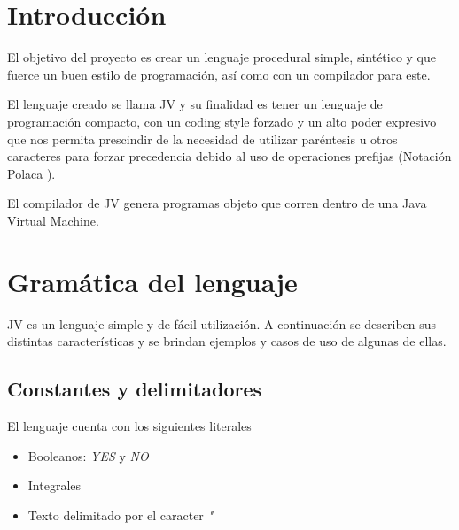 \documentclass[spanish]{article}
\begin{document}
    
    \clearpage
    \tableofcontents
    
    \clearpage

    \section{Introducción}
        \par El objetivo del proyecto es crear un lenguaje procedural simple, sintético y que fuerce un buen estilo de programación, así  como con un compilador para este.\\
        \par El lenguaje creado se llama JV y su finalidad es tener un lenguaje de programación compacto, con un coding style forzado y un alto poder expresivo que nos permita prescindir de la necesidad de utilizar paréntesis u otros caracteres para forzar precedencia debido al uso de operaciones prefijas (Notación Polaca \cite{polish}).
        \par El compilador de JV genera programas objeto que corren dentro de una Java Virtual Machine.
    \clearpage


    \section{Gramática del lenguaje}

        \par JV es un lenguaje simple y de fácil utilización. A continuación se describen sus distintas características y se brindan ejemplos y casos de uso de algunas de ellas.
        \\

        \subsection{Constantes y delimitadores}

            El lenguaje cuenta con los siguientes literales
            \begin{itemize}
            \item Booleanos: \textit{YES} y \textit{NO}    
            \item Integrales
            \item Texto delimitado por el caracter \textit{"}
            \end{itemize}
\end{document}
